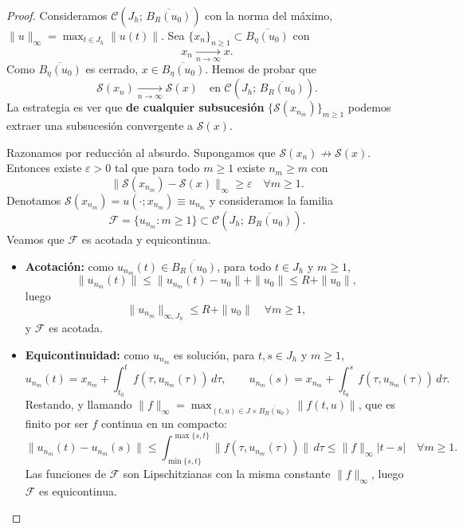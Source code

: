 \begin{proof}
    Consideramos $\mathcal{C}(J_h; \, \overline{B_R(u_0)})$ con la norma del máximo, $\|u\|_{\infty} = \max_{t \in J_h} \|u(t)\|$. Sea $\{x_n\}_{n \geq 1} \subset \overline{B_\eta(u_0)}$ con
    \[
        x_n \xrightarrow[n \to \infty]{} x.
    \]
    Como $\overline{B_\eta(u_0)}$ es cerrado, $x \in \overline{B_\eta(u_0)}$. Hemos de probar que
    \[
        \mathcal{S}(x_n) \xrightarrow[n \to \infty]{} \mathcal{S}(x) \quad \text{en } \mathcal{C}(J_h; \, \overline{B_R(u_0)}).
    \]
    La estrategia es ver que \textbf{de cualquier subsucesión} $\{\mathcal{S}(x_{n_m})\}_{m \geq 1}$ podemos extraer una subsucesión convergente a $\mathcal{S}(x)$.

    Razonamos por reducción al absurdo. Supongamos que $\mathcal{S}(x_n) \not\to \mathcal{S}(x)$. Entonces existe $\varepsilon > 0$ tal que para todo $m \geq 1$ existe $n_m \geq m$ con
    \[
        \| \mathcal{S}(x_{n_m}) - \mathcal{S}(x) \|_\infty \geq \varepsilon \quad \forall m \geq 1.
    \]
    Denotamos $\mathcal{S}(x_{n_m}) = u(\cdot; x_{n_m}) \equiv u_{n_m}$ y consideramos la familia
    \[
        \mathcal{F} = \{ u_{n_m} : m \geq 1 \} \subset \mathcal{C}(J_h; \, \overline{B_R(u_0)}).
    \]
    Veamos que $\mathcal{F}$ es acotada y equicontinua.
    \begin{itemize}
        \item \textbf{Acotación:} como $u_{n_m}(t) \in \overline{B_R(u_0)}$, para todo $t \in J_h$ y $m \geq 1$,
        \[
            \| u_{n_m}(t) \| \leq \| u_{n_m}(t) - u_0 \| + \| u_0 \| \leq R + \| u_0 \|,
        \]
        luego
        \[
            \| u_{n_m} \|_{\infty, J_h} \leq R + \| u_0 \| \quad \forall m \geq 1,
        \]
        y $\mathcal{F}$ es acotada.
        \item \textbf{Equicontinuidad:} como $u_{n_m}$ es solución, para $t, s \in J_h$ y $m \geq 1$,
        \[
            u_{n_m}(t) = x_{n_m} + \int_{t_0}^{t} f(\tau, u_{n_m}(\tau)) \, d\tau, \qquad
            u_{n_m}(s) = x_{n_m} + \int_{t_0}^{s} f(\tau, u_{n_m}(\tau)) \, d\tau.
        \]
        Restando, y llamando $\|f\|_\infty = \max_{(t,u) \in J \times \overline{B_R(u_0)}} \|f(t,u)\|$, que es finito por ser $f$ continua en un compacto:
        \[
            \| u_{n_m}(t) - u_{n_m}(s) \| \leq \int_{\min\{s,t\}}^{\max\{s,t\}} \| f(\tau, u_{n_m}(\tau)) \| \, d\tau \leq \|f\|_\infty |t - s| \quad \forall m \geq 1.
        \]
        Las funciones de $\mathcal{F}$ son Lipschitzianas con la misma constante $\|f\|_\infty$, luego $\mathcal{F}$ es equicontinua.

\end{itemize}
\end{proof}
